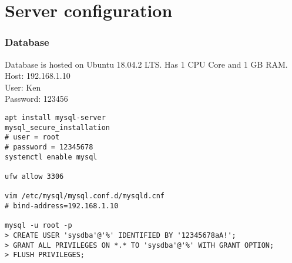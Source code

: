 \documentclass[10pt,a4paper]{article}
\begin{document}
\newpage
\section{Server configuration}

\subsubsection{Database}
Database is hosted on Ubuntu 18.04.2 LTS. Has 1 CPU Core and 1 GB RAM.
Host: 192.168.1.10\\
User: Ken\\
Password: 123456

\begin{verbatim}
apt install mysql-server
mysql_secure_installation
# user = root
# password = 12345678
systemctl enable mysql

ufw allow 3306

vim /etc/mysql/mysql.conf.d/mysqld.cnf
# bind-address=192.168.1.10

mysql -u root -p
> CREATE USER 'sysdba'@'%' IDENTIFIED BY '12345678aA!';
> GRANT ALL PRIVILEGES ON *.* TO 'sysdba'@'%' WITH GRANT OPTION;
> FLUSH PRIVILEGES;

\end{verbatim}
\end{document}
